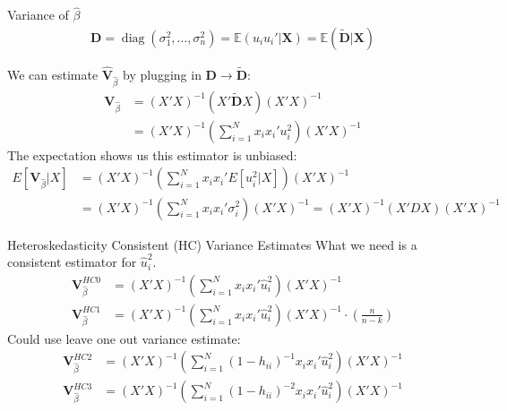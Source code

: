 \documentclass[aspectratio=169]{beamer}
\begin{document}
\begin{frame}{Variance of $\widehat{\beta}$}
\begin{align*}
\mathbf { D } = \operatorname { diag } \left( \sigma _ { 1 } ^ { 2 } , \ldots , \sigma _ { n } ^ { 2 } \right)
= \mathbb { E } \left( u_i u_i'  | \mathbf { X } \right)
= \mathbb { E } \left( \widetilde{\mathbf{D}}| \mathbf { X } \right)
\end{align*}

We can estimate $\widehat{\mathbf{V}}_{\widehat{\beta}}$ by plugging in $\mathbf{D} \rightarrow  \widetilde{\mathbf{D}} $:
\begin{align*}
\mathbf{V}_{\widehat{\beta}} &= (X'X)^{-1} (X'  \widetilde{\mathbf{D}} X) (X'X)^{-1} \\
&= (X'X)^{-1} \left(\sum_{i=1}^N x_i x_i' u_i^2  \right) (X'X)^{-1} 
\end{align*}
The expectation shows us this estimator is unbiased:
\begin{align*}
E[\mathbf{V}_{\widehat{\beta}} | X]
&= (X'X)^{-1} \left(\sum_{i=1}^N x_i x_i' E[u_i^2 | X] \right) (X'X)^{-1} \\
&= (X'X)^{-1} \left(\sum_{i=1}^N x_i x_i' \sigma_i^2 \right) (X'X)^{-1} = (X'X)^{-1} (X' D X) (X'X)^{-1} 
\end{align*}
\end{frame}



\begin{frame}{Heteroskedasticity Consistent (HC) Variance Estimates}
What we need is a consistent estimator for $\hat{u}^2_i$.
\begin{align*}
\mathbf{V}_{\widehat{\beta}}^{HC0}&= (X'X)^{-1} \left(\sum_{i=1}^N x_i x_i' \hat{u}_i^2 \right) (X'X)^{-1} \\
\mathbf{V}_{\widehat{\beta}}^{HC1}&= (X'X)^{-1} \left(\sum_{i=1}^N x_i x_i' \hat{u}_i^2 \right) (X'X)^{-1} \cdot \left(\frac{n}{n-k}  \right)
\end{align*}
Could use leave one out variance estimate:
\begin{align*}
\mathbf{V}_{\widehat{\beta}}^{HC2}&= (X'X)^{-1} \left(\sum_{i=1}^N (1-h_{ii})^{-1} x_i x_i' \hat{u}_i^2 \right) (X'X)^{-1} \\
\mathbf{V}_{\widehat{\beta}}^{HC3}&= (X'X)^{-1} \left(\sum_{i=1}^N (1-h_{ii})^{-2} x_i x_i' \hat{u}_i^2 \right) (X'X)^{-1} \\
\end{align*}
\end{frame}
\end{document}
